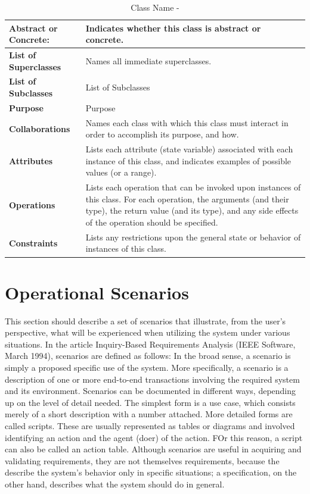 \documentclass[]{article}
\begin{document}
\begin{table}[h]
\caption{Class Name - }
\label{tab:my-table}
\begin{tabular}{|p{}|p{}|}
\hline
\textbf{Abstract or Concrete:} & Indicates whether this class is abstract or concrete.
\\ \hline
\textbf{List of Superclasses}  & Names all immediate superclasses.                                                       
\\ \hline
\textbf{List of Subclasses}    & List of Subclasses                                                                      
\\ \hline
\textbf{Purpose}               & Purpose                                                                                 
\\ \hline
\textbf{Collaborations}        & Names each class with which this class must interact in order to accomplish its purpose, and how.
\\ \hline
\textbf{Attributes}            & Lists each attribute (state variable) associated with each instance of this class, and indicates examples of possible values (or a range).
\\ \hline
\textbf{Operations}            & Lists each operation that can be invoked upon instances of this class.  For each operation, the arguments (and their type), the return value (and its type), and any side effects of the operation should be specified. 
\\ \hline
\textbf{Constraints}           & Lists any restrictions upon the general state or behavior of instances of this class.   
\\ \hline
\end{tabular}
\end{table}

\section{Operational Scenarios}
This section should describe a set of scenarios that illustrate, from the user's perspective, what will be experienced when utilizing the system under various situations. 
In the article Inquiry-Based Requirements Analysis (IEEE Software, March 1994), scenarios are defined as follows: 
In the broad sense, a scenario is simply a proposed specific use of the system. More specifically, a scenario is a description of one or more end-to-end transactions involving the required system and its environment. Scenarios can be documented in different ways, depending up on the level of detail needed. The simplest form is a use case, which consists merely of a short description with a number attached. More detailed forms are called scripts. These are usually represented as tables or diagrams and involved identifying an action and the agent (doer) of the action. FOr this reason, a script can also be called an action table. 
Although scenarios are useful in acquiring and validating requirements, they are not themselves requirements, because the describe the system's behavior only in specific situations; a specification, on the other hand, describes what the system should do in general. 
\end{document}

